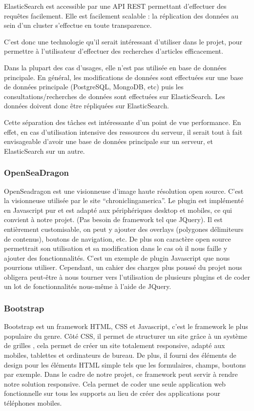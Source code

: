         ElasticSearch est accessible par une API REST permettant d'effectuer des requêtes facilement. Elle est facilement scalable :
        la réplication des données au sein d'un cluster s'effectue en toute transparence.

        C'est donc une technologie qu'il serait intéressant d'utiliser dans le projet, pour permettre à l'utilisateur d'effectuer
        des recherches d'articles efficacement.

        Dans la plupart des cas d'usages, elle n'est pas utilisée en base de données principale. En général, les modifications
        de données sont effectuées sur une base de données principale (PostgreSQL, MongoDB, etc) puis les consultations/recherches
        de données sont effectuées sur ElasticSearch. Les données doivent donc être répliquées sur ElasticSearch.

        Cette séparation des tâches est intéressante d'un point de vue performance. En effet, en cas d'utilisation intensive
        des ressources du serveur, il serait tout à fait envisageable d'avoir une base de données principale sur un serveur,
        et ElasticSearch sur un autre.

        \subsubsection{OpenSeaDragon}
        \label{subsubsec:openseagdragon}
        OpenSeadragon est une visionneuse d’image haute résolution open source. C’est la visionneuse utilisée
        par le site “chroniclingamerica”. Le plugin est implémenté en Javascript pur et est adapté aux périphériques
        desktop et mobiles, ce qui convient à notre projet. (Pas besoin de framework tel que JQuery). Il est entièrement customisable,
        on peut y ajouter des overlays (polygones délimiteurs de contenus), boutons de navigation, etc. De plus son caractère
        open source permettrait son utilisation et sa modification dans le cas où il nous faille y ajouter des fonctionnalités.
        C’est un exemple de plugin Javascript que nous pourrions utiliser. Cependant, un cahier des charges plus poussé du projet
        nous obligera peut-être à nous tourner vers l’utilisation de plusieurs plugins et de coder un lot de fonctionnalités
        nous-même à l’aide de JQuery.

        \subsubsection{Bootstrap}
        \label{subsubsec:bootstrap}
        Bootstrap est un framework HTML, CSS et Javascript, c’est le framework le plus populaire du genre.
        Côté CSS, il permet de structurer un site grâce à un système de grilles , cela permet de créer
        un site totalement responsive, adapté aux mobiles, tablettes et ordinateurs de bureau. De plus,
        il fourni des éléments de design pour les éléments HTML simple tels que les formulaires, champs,
        boutons par exemple. Dans le cadre de notre projet, ce framework peut servir à rendre notre solution responsive.
        Cela permet de coder une seule application web fonctionnelle sur tous les supports au lieu de créer
        des applications pour téléphones mobiles. 


